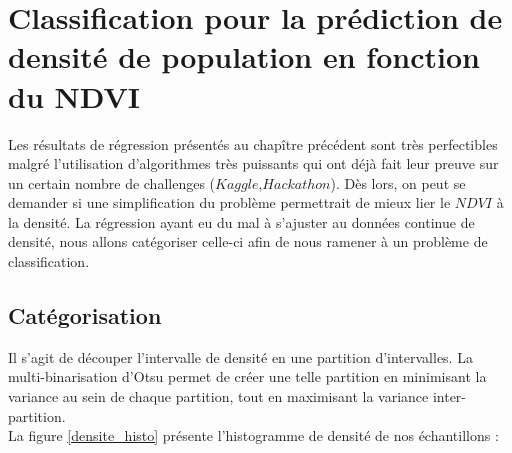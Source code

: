 \documentclass{book}
\begin{document}
\chapter{Classification pour la prédiction de densité de population en fonction du NDVI}

Les résultats de régression présentés au chapître précédent sont très perfectibles malgré l'utilisation d'algorithmes très puissants qui ont déjà fait leur
preuve sur un certain nombre de challenges ($Kaggle$,$Hackathon$). Dès lors, on peut se demander si une simplification du problème permettrait de mieux lier
le $NDVI$ à la densité. La régression ayant eu du mal à s'ajuster au données continue de densité, nous allons catégoriser celle-ci afin de nous ramener à un
problème de classification.

\section{Catégorisation}
Il s'agit de découper l'intervalle de densité en une partition d'intervalles. La multi-binarisation d'Otsu permet de créer une telle partition en
minimisant la variance au sein de chaque partition, tout en maximisant la variance inter-partition.\\
La figure \ref{densite_histo} présente l'histogramme de densité de nos échantillons :
\end{document}
